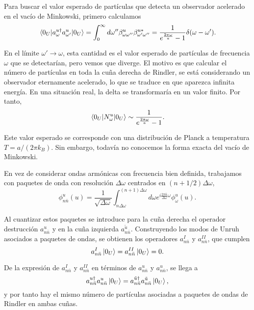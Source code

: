 Para buscar el valor esperado de partículas que detecta un observador acelerado
en el vacío de Minkowski, primero calculamos
\begin{equation}
  \ev{a_\omega^{u\dagger}a_{\omega'}^u}{0_U} = \int_0^\infty d\omega'' \beta_{\omega\omega''}^u
  \beta_{\omega'\omega''}^{u*} = \frac{1}{e^{\frac{2\pi\omega}{a}}-1}\delta(\omega-\omega').
\end{equation}

En el límite $\omega'\to\omega$, esta cantidad es el valor esperado de partículas de frecuencia $\omega$ que se
detectarían, pero vemos que diverge.
El motivo es que calcular el número de partículas en toda la cuña derecha de Rindler, 
se está considerando un observador eternamente acelerado, lo que se traduce en que aparezca infinita
energía.
En una situación real, la delta se transformaría en un valor finito.
Por tanto,
\begin{equation}
  \ev{N_\omega^u}{0_U} \sim \frac{1}{e^{\frac{2\pi\omega}{a}}-1}.
\end{equation}

Este valor esperado se corresponde con una distribución de Planck a temperatura $T=a/(2\pi k_B)$.
Sin embargo, todavía no conocemos la forma exacta del vacío de Minkowski.

En vez de considerar ondas armónicas con frecuencia bien definida, trabajamos con paquetes
de onda con resolución $\Delta \omega$ centrados en $(n+1/2)\Delta \omega$,
\begin{equation}
  \phi_{n\bar n}^u(u)=\frac{1}{\sqrt{\Delta \omega}}\int_{n\Delta\omega}^{(n+1)\Delta \omega}d\omega e^{i\frac{2\pi \bar n}{\Delta \omega}\omega}
  \phi^u_\omega(u).
\end{equation}

Al cuantizar estos paquetes se introduce para la cuña derecha el operador destrucción $a_{n\bar n}^u$
y en la cuña izquierda $a_{n\bar n}^{\tilde u}$. 
Construyendo los modos de Unruh asociados a paquetes de ondas, se obtienen 
los operadores $a_{n\bar n}^I$ y $a_{n\bar n}^{II}$, que cumplen
\begin{equation}
  a_{n\bar n}^I\ket{0_U} = a_{n\bar n}^{II} \ket{0_U} = 0.
\end{equation}

De la expresión de $a_{n\bar n}^I$ y $a_{n\bar n}^{II}$ en términos de $a_{n\bar n}^u$ y $a_{n\bar n}^u$, se llega a 
\begin{equation}
  a_{n\bar n}^{u\dagger} a_{n\bar n}^u \ket{0_U} = a_{n\bar n}^{\tilde u\dagger}a_{n\bar n}^{\tilde u} \ket{0_U},
\end{equation}
y por tanto hay el mismo número de partículas asociadas a paquetes de ondas de Rindler en ambas
cuñas.

